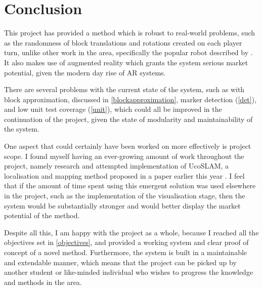 
\chapter{Conclusion}\label{chap:conclusions}
This project has provided a method which is robust to real-world problems, such as the randomness of block translations and rotations created on each player turn, unlike other work in the area, specifically the popular \jenga{} robot described by \citet{jengarobot}. It also makes use of augmented reality which grants the system serious market potential, given the modern day rise of AR systems.

There are several problems with the current state of the system, such as with block approximation, discussed in \cref{blockapproximation}, marker detection (\cref{det}), and low unit test coverage (\cref{unit}), which could all be improved in the continuation of the project, given the state of modularity and maintainability of the system. 

One aspect that could certainly have been worked on more effectively is project scope. I found myself having an ever-growing amount of work throughout the project, namely research and attempted implementation of UcoSLAM, a localisation and mapping method proposed in a paper earlier this year \citep{ucoslampaper}. I feel that if the amount of time spent using this emergent solution was used elsewhere in the project, such as the implementation of the visualisation stage, then the system would be substantially stronger and would better display the market potential of the method.

Despite all this, I am happy with the project as a whole, because I reached all the objectives set in \cref{objectives}, and provided a working system and clear proof of concept of a novel method. Furthermore, the system is built in a maintainable and extendable manner, which means that the project can be picked up by another student or like-minded individual who wishes to progress the knowledge and methods in the area.